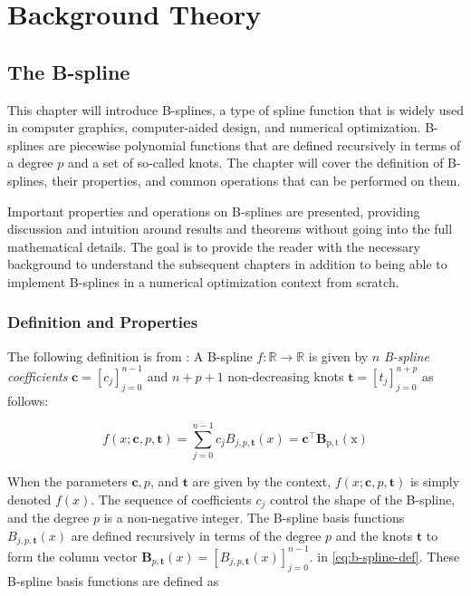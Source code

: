 
\chapter{Background Theory}\label{chap:background-theory}

\section{The B-spline}
\label{sec:b-spline-theory}
This chapter will introduce B-splines, a type of spline function that is widely used in computer graphics, computer-aided design, and numerical optimization. B-splines are piecewise polynomial functions that are defined recursively in terms of a degree $p$ and a set of so-called knots. The chapter will cover the definition of B-splines, their properties, and common operations that can be performed on them. 

Important properties and operations on B-splines are presented, providing discussion and intuition around results and theorems without going into the full mathematical details. The goal is to provide the reader with the necessary background to understand the subsequent chapters in addition to being able to implement B-splines in a numerical optimization context from scratch.

\subsection{Definition and Properties}\label{sec:b-spline-definition}
The following definition is from \cite{Grimstad2016}:
A B-spline $f: \mathbb R \rightarrow \mathbb R$ is given by $n$ \emph{B-spline coefficients} $\mathbf c = [c_j]_{j=0}^{n-1}$ and $n+p+1$ non-decreasing knots $\mathbf t = [t_j]_{j=0}^{n+p}$ as follows:

\begin{equation}\label{eq:b-spline-def}
    f(x ; \mathbf{c}, p, \mathbf{t})=\sum_{j=0}^{n-1} c_j B_{j, p, \mathbf{t}}(x)=\mathbf{c}^{\top} \mathbf{B}_{\mathrm{p}, \mathrm{t}}(\mathrm{x})
\end{equation}

When the parameters $\mathbf{c}, p$, and $\mathbf{t}$ are given by the context, $f(x ; \mathbf{c}, p, \mathbf{t})$ is simply denoted $f(x)$. The sequence of coefficients $c_j$ control the shape of the B-spline, and the degree $p$ is a non-negative integer. The B-spline basis functions $B_{j, p, \mathbf{t}}(x)$ are defined recursively in terms of the degree $p$ and the knots $\mathbf t$ to form the column vector $\mathbf{B}_{p, \mathbf{t}}(x) = [B_{j, p, \mathbf{t}}(x)]_{j=0}^{n-1}$. 
in \cref{eq:b-spline-def}. These B-spline basis functions are defined as

